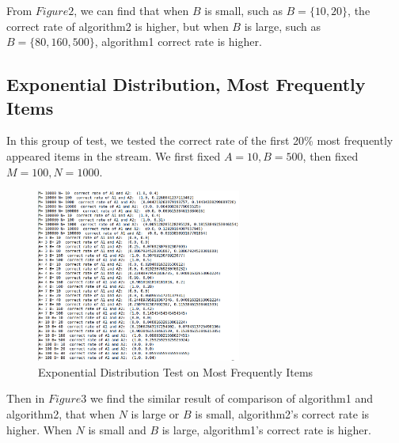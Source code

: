 \documentclass{article}
\begin{document}
From $Figure 2$, we can find that when $B$ is small, such as $B = \{10, 20\}$, the correct rate of algorithm2 is higher, but when $B$ is large, such as $B = \{80, 160, 500\}$, algorithm1 correct rate is higher.

\subsection{Exponential Distribution, Most Frequently Items}
In this group of test, we tested the correct rate of the first 20\% most frequently appeared items in the stream. We first fixed $A=10, B=500$, then fixed $M = 100, N = 1000$. 

\begin{figure}[h]
\begin{center}
\includegraphics[width=0.6\textwidth]{ExpMost} 
\caption{Exponential Distribution Test on Most Frequently Items}
\end{center}
\end{figure}

Then in $Figure 3$ we find the similar result of comparison of algorithm1 and algorithm2, that when $N$ is large or $B$ is small, algorithm2's correct rate is higher. When $N$ is small and $B$ is large, algorithm1's correct rate is higher.
\end{document}
